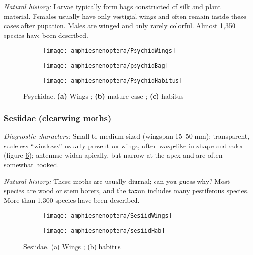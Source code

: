 \noindent{}\textit{Natural history:} Larvae typically form bags constructed of silk and plant material. Females usually have only vestigial wings and often remain inside these cases after pupation. Males are winged and only rarely colorful. Almost 1,350 species have been described.

\begin{figure}[ht!]
    \centering
    \begin{subfigure}[ht!]{0.35\textwidth}
        \texttt{[image: amphiesmenoptera/PsychidWings]}
        \caption{}
        \label{fig:psychid1}
    \end{subfigure}
    \hfill 
    \begin{subfigure}[ht!]{0.13\textwidth}
        \texttt{[image: amphiesmenoptera/psychidBag]}
        \caption{}
        \label{fig:psychid2}
    \end{subfigure}
    \hfill 
    \begin{subfigure}[ht!]{0.42\textwidth}
        \texttt{[image: amphiesmenoptera/PsychidHabitus]}
        \caption{}
        \label{fig:psychid3}
    \end{subfigure}
    \caption{Psychidae. \textbf{(a)} Wings \citep[Fig. 46]{comstock1918wings}; \textbf{(b)} mature case \citep[][plate XXV, Fig. 4]{bhlitem82061AustrInsect}; \textbf{(c)} habitus \citep[][Fig. 374A]{escherich1914forstinsekten}}\label{fig:psychids}
\end{figure}

\subsubsection{Sesiidae (clearwing moths)}
\noindent{}\textit{Diagnostic characters:} Small to medium-sized (wingspan 15--50 mm); transparent, scaleless ``windows'' usually present on wings; often wasp-like in shape and color (figure \ref{fig:sesiid2}); antennae widen apically, but narrow at the apex and are often somewhat hooked.\vspace{3mm}

\noindent{}\textit{Natural history:} These moths are usually diurnal; can you guess why? Most species are wood or stem borers, and the taxon includes many pestiferous species. More than 1,300 species have been described.

\begin{figure}[ht!]
    \centering
    \begin{subfigure}[ht!]{0.4\textwidth}
        \texttt{[image: amphiesmenoptera/SesiidWings]}
        \caption{}
        \label{fig:sesiid1}
    \end{subfigure}
    \hfill 
    \begin{subfigure}[ht!]{0.52\textwidth}
        \texttt{[image: amphiesmenoptera/sesiidHab]}
        \caption{}
        \label{fig:sesiid2}
    \end{subfigure}
    \caption{Sesiidae. (a) Wings \citep[][Fig. 8]{bhl118765}; (b) habitus \citep[][Fig. 351A]{escherich1914forstinsekten}}\label{fig:sesiids}
\end{figure}

